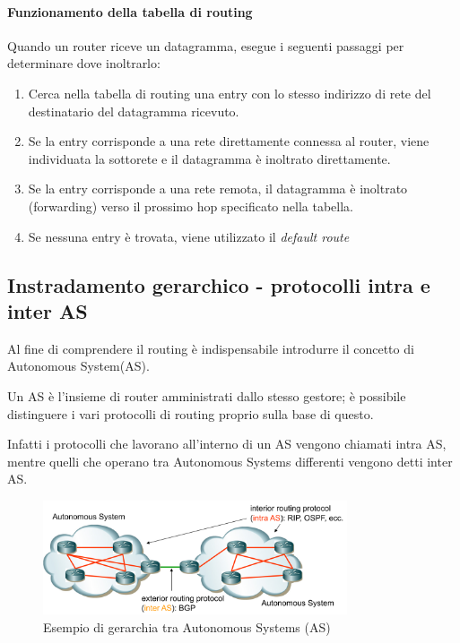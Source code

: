 \paragraph{Funzionamento della tabella di routing}

Quando un router riceve un datagramma, esegue i seguenti passaggi per determinare dove inoltrarlo:
\begin{enumerate}
    \item Cerca nella tabella di routing una entry con lo stesso indirizzo di rete del destinatario del datagramma ricevuto.
    \item Se la entry corrisponde a una rete direttamente connessa al router, viene individuata la sottorete e il datagramma è inoltrato direttamente.
    \item Se la entry corrisponde a una rete remota, il datagramma è inoltrato (forwarding) verso il prossimo hop specificato nella tabella.
    \item Se nessuna entry è trovata, viene utilizzato il \textit{default route}
\end{enumerate}

\newpage

\subsection{Instradamento gerarchico - protocolli intra e inter AS}
Al fine di comprendere il routing è indispensabile introdurre il concetto di Autonomous System(AS).

Un AS è l'insieme di router amministrati dallo stesso gestore; è possibile distinguere i vari protocolli di routing proprio sulla base di questo.

Infatti i protocolli che lavorano all'interno di un AS vengono chiamati intra AS, mentre quelli che operano tra Autonomous Systems differenti vengono detti inter AS.

\begin{figure}[h!]
    \centering
    \includegraphics[width=0.8\textwidth]{images/asgerarchia.png}
    \caption{Esempio di gerarchia tra Autonomous Systems (AS)}
    \label{fig:asgerarchia}
\end{figure}



